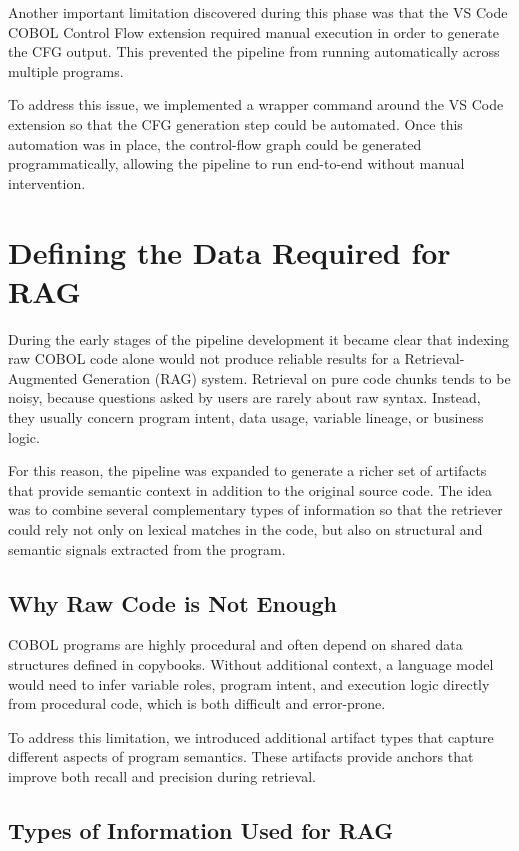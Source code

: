 \documentclass[11pt]{article}
\begin{document}
Another important limitation discovered during this phase was that the VS Code COBOL Control Flow extension required manual execution in order to generate the CFG output. This prevented the pipeline from running automatically across multiple programs.

To address this issue, we implemented a wrapper command around the VS Code extension so that the CFG generation step could be automated. Once this automation was in place, the control-flow graph could be generated programmatically, allowing the pipeline to run end-to-end without manual intervention.


\section{Defining the Data Required for RAG}
\label{sec:ragdata}

During the early stages of the pipeline development it became clear that indexing raw COBOL code alone would not produce reliable results for a Retrieval-Augmented Generation (RAG) system. Retrieval on pure code chunks tends to be noisy, because questions asked by users are rarely about raw syntax. Instead, they usually concern program intent, data usage, variable lineage, or business logic.

For this reason, the pipeline was expanded to generate a richer set of artifacts that provide semantic context in addition to the original source code. The idea was to combine several complementary types of information so that the retriever could rely not only on lexical matches in the code, but also on structural and semantic signals extracted from the program.

\subsection*{Why Raw Code is Not Enough}

COBOL programs are highly procedural and often depend on shared data structures defined in copybooks. Without additional context, a language model would need to infer variable roles, program intent, and execution logic directly from procedural code, which is both difficult and error-prone. 

To address this limitation, we introduced additional artifact types that capture different aspects of program semantics. These artifacts provide anchors that improve both recall and precision during retrieval.

\subsection*{Types of Information Used for RAG}
\end{document}
